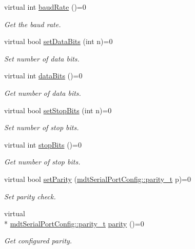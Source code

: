 \begin{DoxyCompactItemize}
virtual int \hyperlink{classmdt_abstract_serial_port_ad9f5b7e939c60cd3766d2bf76df4af4b}{baud\-Rate} ()=0
\begin{DoxyCompactList}\small\item\em Get the baud rate. \end{DoxyCompactList}\item 
virtual bool \hyperlink{classmdt_abstract_serial_port_a323e590d6ead87033985ffff1ecfae81}{set\-Data\-Bits} (int n)=0
\begin{DoxyCompactList}\small\item\em Set number of data bits. \end{DoxyCompactList}\item 
virtual int \hyperlink{classmdt_abstract_serial_port_a63e2a14c416d9c3516ec74f5e37f4cc7}{data\-Bits} ()=0
\begin{DoxyCompactList}\small\item\em Get number of data bits. \end{DoxyCompactList}\item 
virtual bool \hyperlink{classmdt_abstract_serial_port_a164c7be802a04805e5b401fc5011208b}{set\-Stop\-Bits} (int n)=0
\begin{DoxyCompactList}\small\item\em Set number of stop bits. \end{DoxyCompactList}\item 
virtual int \hyperlink{classmdt_abstract_serial_port_abae48c24634c3e2d298f1cff98b250ed}{stop\-Bits} ()=0
\begin{DoxyCompactList}\small\item\em Get number of stop bits. \end{DoxyCompactList}\item 
virtual bool \hyperlink{classmdt_abstract_serial_port_ac9c6990ac9861f21dcfe27c989b78545}{set\-Parity} (\hyperlink{classmdt_serial_port_config_a4b9e444637cf0193a125fabdd67d8bfe}{mdt\-Serial\-Port\-Config\-::parity\-\_\-t} p)=0
\begin{DoxyCompactList}\small\item\em Set parity check. \end{DoxyCompactList}\item 
virtual \\*
\hyperlink{classmdt_serial_port_config_a4b9e444637cf0193a125fabdd67d8bfe}{mdt\-Serial\-Port\-Config\-::parity\-\_\-t} \hyperlink{classmdt_abstract_serial_port_ac361191b58789065fcea742019b958f9}{parity} ()=0
\begin{DoxyCompactList}\small\item\em Get configured parity. \end{DoxyCompactList}\item 

\end{DoxyCompactItemize}
